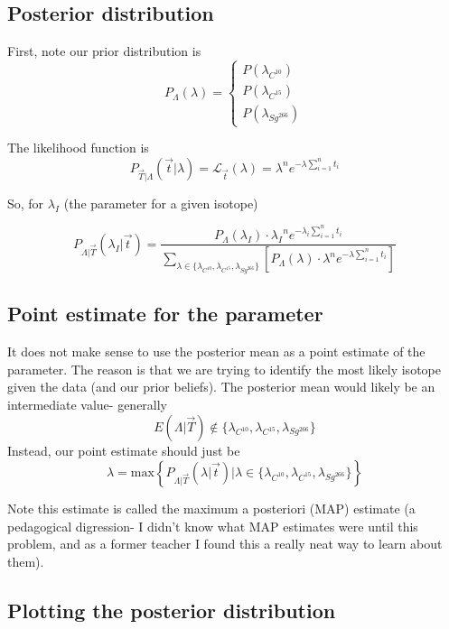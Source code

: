 \documentclass[paper=a4, fontsize=11pt]{scrartcl} %
\numberwithin{equation}{section} %
\numberwithin{figure}{section} %
\numberwithin{table}{section} %
\begin{document}
\subsection{Posterior distribution}

First, note our prior distribution is
\[
P_{\Lambda}(\lambda) =
\begin{cases}
   P(\lambda_{C^{10}}) \\
   P(\lambda_{C^{15}}) \\
   P(\lambda_{Sg^{266}})
\end{cases}
\]

The likelihood function is
\[P_{\vec{T} | \Lambda} (\vec{t} | \lambda) = \mathcal{L}_{\vec{t}} (\lambda) = \lambda^n e^{- \lambda \sum_{i=1}^n t_i}\]

So, for $\lambda_I$ (the parameter for a given isotope)

\[P_{\Lambda | \vec{T} } (\lambda_I | \vec{t}) = \frac{P_{\Lambda}(\lambda_I) \cdot {\lambda_I}^n e^{- \lambda_i \sum_{i=1}^n t_i}}{\sum_{\lambda \in \{\lambda_{C^{10}}, \lambda_{C^{15}}, \lambda_{Sg^{266}}\}} \left[ P_\Lambda(\lambda) \cdot \lambda^n e^{- \lambda \sum_{i=1}^n t_i}\right]}\]

\subsection{Point estimate for the parameter}

It does not make sense to use the posterior mean as a point estimate of the parameter. The reason is that we are trying to identify the most likely isotope given the data (and our prior beliefs). The posterior mean would likely be an intermediate value- generally
\[E(\Lambda | \vec{T}) \notin \{\lambda_{C^{10}}, \lambda_{C^{15}}, \lambda_{Sg^{266}}\}\]
Instead, our point estimate should just be
\[\hat{\lambda} = \textrm{max} \left\{ P_{\Lambda | \vec{T}} (\lambda | \vec{t}) \big| \lambda \in \{\lambda_{C^{10}}, \lambda_{C^{15}}, \lambda_{Sg^{266}}\} \right\} \]

Note this estimate is called the maximum a posteriori (MAP) estimate (a pedagogical digression- I didn't know what MAP estimates were until this problem, and as a former teacher I found this a really neat way to learn about them).

\subsection{Plotting the posterior distribution}
\end{document}
